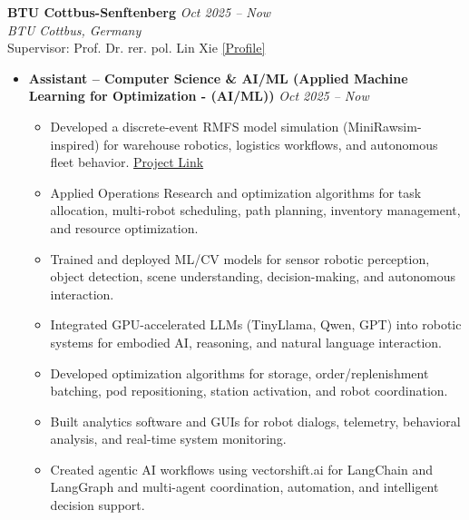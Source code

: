 \documentclass[10pt, a4paper]{article}
\begin{document}
\textbf{BTU Cottbus-Senftenberg} \hfill \textit{Oct 2025 -- Now} \\
\textit{BTU Cottbus, Germany} \\
Supervisor: Prof. Dr. rer. pol. Lin Xie \href{https://www.b-tu.de/en/fg-wirtschaftsinformatik-analytics/team/professor#c432185}{[Profile]}
\begin{itemize}
  \item \textbf{Assistant – Computer Science \& AI/ML (Applied Machine Learning for Optimization - (AI/ML))} \hfill \textit{Oct 2025 -- Now}
  \begin{itemize}[leftmargin=1.2em, itemsep=1.5pt]
    \item Developed a discrete-event RMFS model simulation (MiniRawsim-inspired) for warehouse robotics, logistics workflows, and autonomous fleet behavior. \href{https://aminadineh.me/}{Project Link}
    \item Applied Operations Research and optimization algorithms for task allocation, multi-robot scheduling, path planning, inventory management, and resource optimization.
    \item Trained and deployed ML/CV models for sensor robotic perception, object detection, scene understanding, decision-making, and autonomous interaction.
    \item Integrated GPU-accelerated LLMs (TinyLlama, Qwen, GPT) into robotic systems for embodied AI, reasoning, and natural language interaction.
    \item Developed optimization algorithms for storage, order/replenishment batching, pod repositioning, station activation, and robot coordination.
    \item Built analytics software and GUIs for robot dialogs, telemetry, behavioral analysis, and real-time system monitoring.
    \item Created agentic AI workflows using vectorshift.ai for LangChain and LangGraph and multi-agent coordination, automation, and intelligent decision support.
  \end{itemize}
\end{itemize}
\vspace{\baselineskip}
\end{document}
